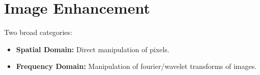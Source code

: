 \section*{Image Enhancement}

Two broad categories:

\begin{itemize}
  \item \textbf{Spatial Domain:} Direct manipulation of pixels.
  \item \textbf{Frequency Domain:} Manipulation of fourier/wavelet
    transforms of images.
\end{itemize}

